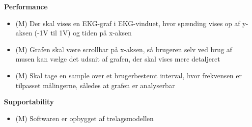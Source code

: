 \textbf{Performance}
\begin{itemize}
	\item (M) Der skal vises en EKG-graf i EKG-vinduet, hvor spænding vises op af y-aksen (-1V til 1V) og tiden på x-aksen
	\item (M) Grafen skal være scrollbar på x-aksen, så brugeren selv ved brug af musen kan vælge det udsnit af grafen, der skal vises mere detaljeret
	\item (M) Skal tage en sample over et brugerbestemt interval, hvor frekvensen  er tilpasset målingerne, således at grafen er analyserbar
\end{itemize}

\textbf{Supportability}
\begin{itemize}
	\item (M) Softwaren er opbygget af trelagsmodellen
\end{itemize}















